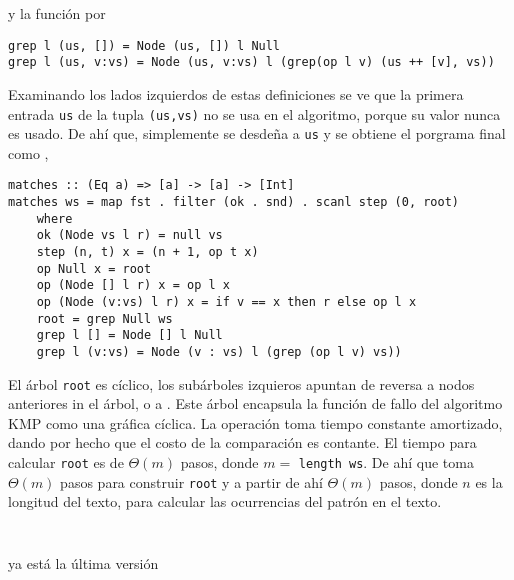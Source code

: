 y la función  por
\begin{verbatim}
grep l (us, []) = Node (us, []) l Null
grep l (us, v:vs) = Node (us, v:vs) l (grep(op l v) (us ++ [v], vs))
\end{verbatim}

Examinando los lados izquierdos de estas definiciones se ve que la primera entrada \texttt{us} de la tupla \texttt{(us,vs)} no se usa en el algoritmo,
porque su valor nunca es usado. De ahí que, simplemente se desdeña a \texttt{us} y se obtiene el porgrama final como , 

\begin{verbatim}
matches :: (Eq a) => [a] -> [a] -> [Int]
matches ws = map fst . filter (ok . snd) . scanl step (0, root)
    where
    ok (Node vs l r) = null vs
    step (n, t) x = (n + 1, op t x)
    op Null x = root
    op (Node [] l r) x = op l x
    op (Node (v:vs) l r) x = if v == x then r else op l x
    root = grep Null ws
    grep l [] = Node [] l Null
    grep l (v:vs) = Node (v : vs) l (grep (op l v) vs))
\end{verbatim}

El árbol \texttt{root} es cíclico, %
los subárboles izquieros apuntan de reversa a nodos anteriores in el árbol, o a .
Este árbol encapsula la función de fallo %
del algoritmo KMP como una gráfica cíclica. La operación  toma tiempo constante amortizado, dando por hecho que el costo de la comparación es contante.
El tiempo para calcular \texttt{root} es de $\Theta(m)$ pasos, donde $m =$ \texttt{length ws}. De ahí que  toma $\Theta(m)$ pasos para construir \texttt{root}
y a partir de ahí $\Theta(m)$ pasos, donde $n$ es la longitud del texto, para calcular las ocurrencias del patrón en el texto.
\inputminted{haskell}{codigo/haskell/mp-1.hs}
\inputminted{haskell}{codigo/haskell/mp-2.hs}



ya está la última versión
\inputminted{haskell}{codigo/haskell/kmp.hs}

